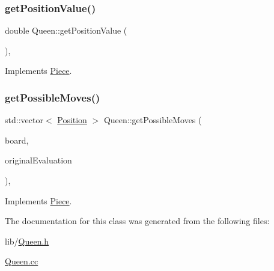 \subsubsection{\texorpdfstring{get\+Position\+Value()}{getPositionValue()}}
{\footnotesize\ttfamily double Queen\+::get\+Position\+Value (\begin{DoxyParamCaption}{ }\end{DoxyParamCaption})\hspace{0.3cm}{\ttfamily [override]}, {\ttfamily [virtual]}}



Implements \hyperlink{class_piece_a4adfa58b4f0368c9a5859afcf294e0a4}{Piece}.

\mbox{\label{class_queen_ab599f550fe04cda1f421e657841022fd}} 
\subsubsection{\texorpdfstring{get\+Possible\+Moves()}{getPossibleMoves()}}
{\footnotesize\ttfamily std\+::vector$<$ \hyperlink{struct_position}{Position} $>$ Queen\+::get\+Possible\+Moves (\begin{DoxyParamCaption}\item[{std\+::shared\+\_\+ptr$<$ \hyperlink{class_base_board}{Base\+Board} $>$}]{board,  }\item[{bool}]{original\+Evaluation }\end{DoxyParamCaption})\hspace{0.3cm}{\ttfamily [override]}, {\ttfamily [virtual]}}



Implements \hyperlink{class_piece_a8891924c280568529878549f59541925}{Piece}.



The documentation for this class was generated from the following files\+:\begin{DoxyCompactItemize}
\item 
lib/\hyperlink{_queen_8h}{Queen.\+h}\item 
\hyperlink{_queen_8cc}{Queen.\+cc}\end{DoxyCompactItemize}
